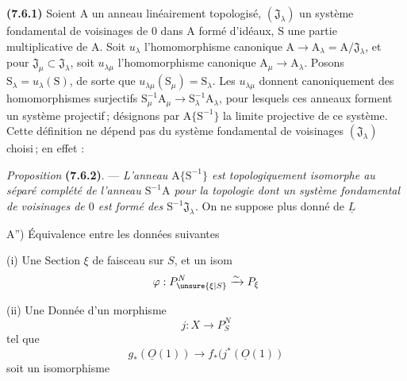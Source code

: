 \textbf{(7.6.1)} Soient $\mathrm{A}$ un anneau linéairement topologisé, $(\mathfrak{J}_\lambda)$ un système fondamental de voisinages de $0$ dans $\mathrm{A}$ formé d’idéaux, $\mathrm{S}$ une partie multiplicative de $\mathrm{A}$. Soit $u_\lambda$ l’homomorphisme canonique $\mathrm{A}\to \mathrm{A}_\lambda=\mathrm{A}/\mathfrak{J}_\lambda$, et pour $\mathfrak{J}_\mu\subset \mathfrak{J}_\lambda$, soit $u_{\lambda\mu}$ l’homomorphisme canonique $\mathrm{A}_\mu\to \mathrm{A}_\lambda$. Posons $\mathrm{S}_\lambda=u_\lambda(\mathrm{S})$, de sorte que $u_{\lambda\mu}(\mathrm{S}_\mu)=\mathrm{S}_\lambda$. Les $u_{\lambda\mu}$ donnent canoniquement des homomorphismes surjectifs $\mathrm{S}_\mu^{-1}\mathrm{A}_\mu\to \mathrm{S}_\lambda^{-1}\mathrm{A}_\lambda$, pour lesquels ces anneaux forment un système projectif\,; désignons par $\mathrm{A}\{\mathrm{S}^{-1}\}$ la limite projective de ce système. Cette définition ne dépend pas du système fondamental de voisinages $(\mathfrak{J}_\lambda)$ choisi\,; en effet :

\textit{Proposition} \textbf{(7.6.2)}. --- \textit{L’anneau $\mathrm{A}\{\mathrm{S}^{-1}\}$ est topologiquement isomorphe au séparé complété de l’anneau $\mathrm{S}^{-1}\mathrm{A}$ pour la topologie dont un système fondamental de voisinages de $0$ est formé des $\mathrm{S}^{-1}\mathfrak{J}_\lambda$.}
On ne suppose plus donné de $\underline{L}$

A'') Équivalence entre les données suivantes

(i) Une Section $\xi$ de faisceau  sur $S$,  et un isom
\[
\varphi:P_{\unsure{\xi|S}}^{N}\xrightarrow{\sim}P_{\xi}
\]

(ii) Une Donnée d'un morphisme
\[
j:X\longrightarrow P_{S}^{N}
\]
tel que 
\[
g_{*}(\underline{O}(1))\longrightarrow f_{*}(j^{*}(\underline{O}(1))
\]
soit un isomorphisme



